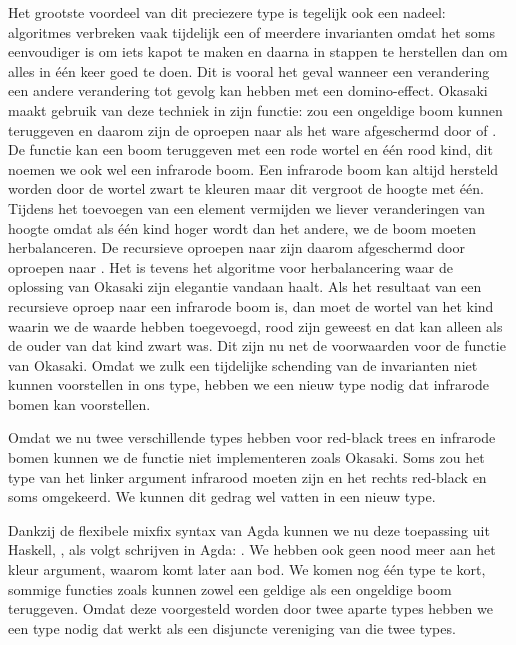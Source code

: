 Het grootste voordeel van dit preciezere type is tegelijk ook een nadeel:
algoritmes verbreken vaak tijdelijk een of meerdere invarianten omdat het soms
eenvoudiger is om iets kapot te maken en daarna in stappen te herstellen dan om
alles in één keer goed te doen. Dit is vooral het geval wanneer een verandering
een andere verandering tot gevolg kan hebben met een domino-effect. Okasaki
maakt gebruik van deze techniek in zijn  functie:  zou
een ongeldige boom kunnen teruggeven en daarom zijn de oproepen naar
 als het ware afgeschermd door  of .
De  functie kan een boom teruggeven met een rode wortel en één rood
kind, dit noemen we ook wel een infrarode boom. Een infrarode boom kan altijd
hersteld worden door de wortel zwart te kleuren maar dit vergroot de hoogte met
één. Tijdens het toevoegen van een element vermijden we liever veranderingen
van hoogte omdat als één kind hoger wordt dan het andere, we de boom moeten
herbalanceren. De recursieve oproepen naar  zijn daarom afgeschermd
door oproepen naar . Het is tevens het algoritme voor
herbalancering waar de oplossing van Okasaki zijn elegantie vandaan haalt. Als
het resultaat van een recursieve oproep naar  een infrarode boom is,
dan moet de wortel van het kind waarin we de waarde hebben toegevoegd, rood
zijn geweest en dat kan alleen als de ouder van dat kind zwart was. Dit zijn nu
net de voorwaarden voor de  functie van Okasaki. Omdat we zulk
een tijdelijke schending van de invarianten niet kunnen voorstellen in ons
 type, hebben we een nieuw type nodig dat infrarode bomen kan
voorstellen.


Omdat we nu twee verschillende types hebben voor red-black trees en infrarode
bomen kunnen we de  functie niet implementeren zoals Okasaki.
Soms zou het type van het linker argument infrarood moeten zijn en het rechts
red-black en soms omgekeerd. We kunnen dit gedrag wel vatten in een nieuw type.


Dankzij de flexibele mixfix syntax van Agda kunnen we nu deze toepassing uit
Haskell, , als volgt schrijven in Agda:
. We hebben ook geen nood meer aan het kleur
argument, waarom komt later aan bod.
We komen nog één type te kort, sommige functies zoals  kunnen zowel
een geldige als een ongeldige boom teruggeven. Omdat deze voorgesteld worden
door twee aparte types hebben we een type nodig dat werkt als een disjuncte
vereniging van die twee types.

